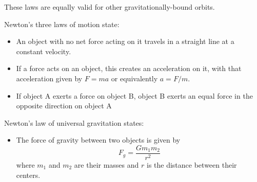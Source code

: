 \documentclass[12pt]{article}
\newcommand{\BI}{\begin{itemize}}
\newcommand{\EI}{\end{itemize}}
\begin{document}
These laws are equally valid for other gravitationally-bound orbits.

\bigskip
\bigskip
\bigskip

\begin{center}
Newton's three laws of motion state:
\end{center}

\BI
\item An object with no net force acting on it travels in a straight line at a constant velocity.
\item If a force acts on an object, this creates an acceleration on it, with that acceleration given by $F=ma$ or equivalently $a=F/m$.
\item If object A exerts a force on object B, object B exerts an equal force in the opposite direction on object A
\EI

\bigskip
\bigskip
\bigskip

\begin{center}
Newton's law of universal gravitation states:
\end{center}

\BI
\item
The force of gravity between two objects is given by
$$F_g=\frac{Gm_1m_2}{r^2}$$
where $m_1$ and $m_2$ are their masses and $r$ is the distance between their centers.
\EI
\end{document}
